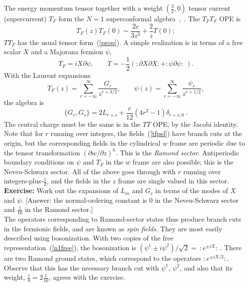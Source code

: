 The energy momentum tensor together with a weight $(\frac{3}{2},0)$
tensor current (supercurrent)
$T_F$ form the $N=1$ superconformal algebra~\cite{Rns},~\cite{rNS}. 
The
$T_F T_F$ OPE is
\begin{equation}
T_F(z) T_F(0) \sim \frac{2c}{3z^3} + \frac{2}{z} T(0);
\end{equation}
$TT_F$ has the usual tensor form~(\ref{prop}).
A simple realization is in terms of a free scalar $X$ and a Majorana
fermion $\psi$,
\begin{equation}
T_F = i X \partial \psi, \qquad T = -\frac{1}{2}
( :\! \partial X \partial X \! : + :\! \psi \partial \psi 
\!:\ ).
\label{n1free}
\end{equation}
With the Laurent expansions
\begin{equation}
T_F(z) = \sum_{r=-\infty}^{\infty} \frac{G_r}{z^{r+3/2}}, \qquad
\psi(z) = \sum_{r=-\infty}^{\infty} \frac{\psi_r}{z^{r+1/2}},
\label{tfpsl}
\end{equation}
the algebra is 
\begin{equation}
\{ G_r, G_s \} = 2 L_{r+s} + \frac{c}{12}(4 r^2 - 1) 
\delta_{r+s,0}\ .
\end{equation}
The central charge must be the same is in the $TT$ OPE, by the 
Jacobi identity.
Note that for $r$ running over integers, the fields~(\ref{tfpsl})
have branch cuts at the origin, but the corresponding fields in the
cylindrical $w$ frame are periodic due to the tensor transformation
$(\partial w/\partial z)^{h}$.  This is the {\it Ramond sector}.
Antiperiodic boundary conditions on $\psi$ and $T_F$ in the $w$
frame are also possible; this is the Neveu-Schwarz sector.  All of
the above goes through with $r$ running over
integers-plus-$\frac{1}{2}$, and the fields in the $z$ frame are
single valued in this sector.\\[3pt] 
{\bf Exercise:} Work out the
expansions of $L_m$ and $G_r$ in terms of the modes of $X$ and
$\psi$.  [Answer: the normal-ordering constant is $0$ in the
Neveu-Schwarz sector and $\frac{1}{16}$ in the Ramond
sector.]\\[3pt]
The operators corresponding to Ramond-sector states
thus produce branch cuts in the fermionic fields, and are known as
{\it spin fields}.  They are most easily described using
bosonization.  With two copies of the free
representation~(\ref{n1free}), the bosonization is $(\psi^1 \pm
i\psi^2)/\sqrt{2} = \ :\! e^{\pm i X} \!:\ $.  There are two Ramond
ground states, which correspond to the operators $:\! e^{\pm i X/2}
\!:$.  Observe that this has the necessary branch cut with $\psi^1$,
$\psi^2$, and also that its weight, $\frac{1}{8} = 2\frac{1}{16}$,
agrees with the exercise.

